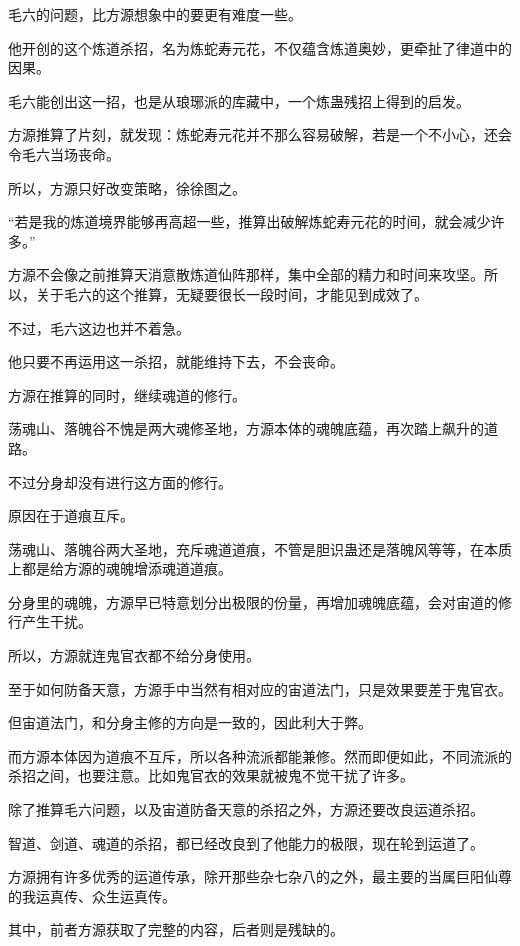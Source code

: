 
\begin{this_body}

毛六的问题，比方源想象中的要更有难度一些。

他开创的这个炼道杀招，名为炼蛇寿元花，不仅蕴含炼道奥妙，更牵扯了律道中的因果。

毛六能创出这一招，也是从琅琊派的库藏中，一个炼蛊残招上得到的启发。

方源推算了片刻，就发现：炼蛇寿元花并不那么容易破解，若是一个不小心，还会令毛六当场丧命。

所以，方源只好改变策略，徐徐图之。

“若是我的炼道境界能够再高超一些，推算出破解炼蛇寿元花的时间，就会减少许多。”

方源不会像之前推算天消意散炼道仙阵那样，集中全部的精力和时间来攻坚。所以，关于毛六的这个推算，无疑要很长一段时间，才能见到成效了。

不过，毛六这边也并不着急。

他只要不再运用这一杀招，就能维持下去，不会丧命。

方源在推算的同时，继续魂道的修行。

荡魂山、落魄谷不愧是两大魂修圣地，方源本体的魂魄底蕴，再次踏上飙升的道路。

不过分身却没有进行这方面的修行。

原因在于道痕互斥。

荡魂山、落魄谷两大圣地，充斥魂道道痕，不管是胆识蛊还是落魄风等等，在本质上都是给方源的魂魄增添魂道道痕。

分身里的魂魄，方源早已特意划分出极限的份量，再增加魂魄底蕴，会对宙道的修行产生干扰。

所以，方源就连鬼官衣都不给分身使用。

至于如何防备天意，方源手中当然有相对应的宙道法门，只是效果要差于鬼官衣。

但宙道法门，和分身主修的方向是一致的，因此利大于弊。

而方源本体因为道痕不互斥，所以各种流派都能兼修。然而即便如此，不同流派的杀招之间，也要注意。比如鬼官衣的效果就被鬼不觉干扰了许多。

除了推算毛六问题，以及宙道防备天意的杀招之外，方源还要改良运道杀招。

智道、剑道、魂道的杀招，都已经改良到了他能力的极限，现在轮到运道了。

方源拥有许多优秀的运道传承，除开那些杂七杂八的之外，最主要的当属巨阳仙尊的我运真传、众生运真传。

其中，前者方源获取了完整的内容，后者则是残缺的。


\end{this_body}
